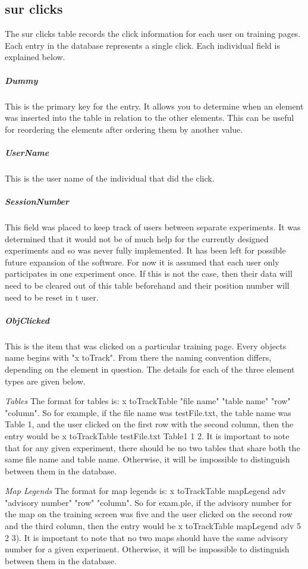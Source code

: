 \documentclass[article]{ij4uq}              %
\begin{document}
\subsection{sur clicks}
The sur clicks table records the click information for each user on training pages. Each entry in the database represents a single click. Each individual field is explained below. 

\subparagraph{Dummy}
This is the primary key for the entry. It allows you to determine when an element was inserted into the table in relation to the other elements. This can be useful for reordering the elements after ordering them by another value.

\subparagraph{UserName}
This is the user name of the individual that did the click.

\subparagraph{SessionNumber}
This field was placed to keep track of users between separate experiments. It was determined that it would not be of much help for the currently designed experiments and so was never fully implemented. It has been left for possible future expansion of the software. For now it is assumed that each user only participates in one experiment once. If this is not the case, then their data will need to be cleared out of this table beforehand and their position number will need to be reset in t user.

\subparagraph{ObjClicked}
This is the item that was clicked on a particular training page. Every objects name begins with "x toTrack". From there the naming convention differs, depending on the element in question. The details for each of the three element types are given below.
 
\emph{Tables}
The format for tables is: x toTrackTable "file name" "table name" "row" "column". So for example, if the file name was testFile.txt, the table name was Table 1, and the user clicked on the first row with the second column, then the entry would be x toTrackTable testFile.txt Table1 1 2. 
It is important to note that for any given experiment, there should be no two tables that share both the same file name and table name. Otherwise, it will be impossible to distinguish between them in the database.

\emph{Map Legends}
The format for map legends is: x toTrackTable mapLegend adv "advisory number" "row" "column". So for exam.ple, if the advisory number for the map on the training screen was five and the user clicked on the second row and the third column, then the entry would be x toTrackTable mapLegend adv 5 2 3). 
It is important to note that no two maps should have the same advisory number for a given experiment. Otherwise, it will be impossible to distinguish between them in the database.
\end{document}
